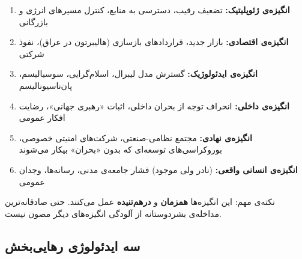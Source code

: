 \begin{tcolorbox}[defbox, title={طبقه‌بندی انگیزه‌ها}]
\begin{enumerate}
\item \textbf{انگیزه‌ی ژئوپلیتیک:} تضعیف رقیب، دسترسی به منابع، کنترل
مسیرهای انرژی و بازرگانی
\item \textbf{انگیزه‌ی اقتصادی:} بازار جدید، قراردادهای بازسازی
(هالیبرتون در عراق)، نفوذ شرکتی
\item \textbf{انگیزه‌ی ایدئولوژیک:} گسترش مدل لیبرال، اسلام‌گرایی،
سوسیالیسم، پان‌ناسیونالیسم
\item \textbf{انگیزه‌ی داخلی:} انحراف توجه از بحران داخلی، اثبات
«رهبری جهانی»، رضایت افکار عمومی
\item \textbf{انگیزه‌ی نهادی:} مجتمع نظامی-صنعتی، شرکت‌های امنیتی
خصوصی، بوروکراسی‌های توسعه‌ای که بدون «بحران» بیکار می‌شوند
\item \textbf{انگیزه‌ی انسانی واقعی:} (نادر ولی موجود) فشار جامعه‌ی مدنی،
رسانه‌ها، وجدان عمومی
\end{enumerate}
\end{tcolorbox}

نکته‌ی مهم: این انگیزه‌ها \textbf{همزمان} و \textbf{درهم‌تنیده} عمل
می‌کنند. حتی صادقانه‌ترین مداخله‌ی بشردوستانه از آلودگی انگیزه‌های
دیگر مصون نیست.

\subsection{سه ایدئولوژی رهایی‌بخش}

